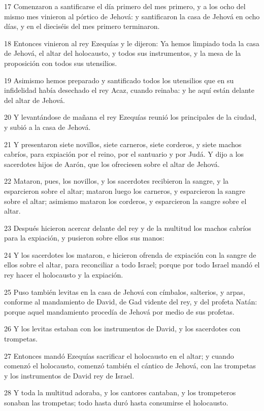 \par 17 Comenzaron a santificarse el día primero del mes primero, y a los ocho del mismo mes vinieron al pórtico de Jehová: y santificaron la casa de Jehová en ocho días, y en el dieciséis del mes primero terminaron.
\par 18 Entonces vinieron al rey Ezequías y le dijeron: Ya hemos limpiado toda la casa de Jehová, el altar del holocausto, y todos sus instrumentos, y la mesa de la proposición con todos sus utensilios.
\par 19 Asimismo hemos preparado y santificado todos los utensilios que en su infidelidad había desechado el rey Acaz, cuando reinaba: y he aquí están delante del altar de Jehová.
\par 20 Y levantándose de mañana el rey Ezequías reunió los principales de la ciudad, y subió a la casa de Jehová.
\par 21 Y presentaron siete novillos, siete carneros, siete corderos, y siete machos cabríos, para expiación por el reino, por el santuario y por Judá. Y dijo a los sacerdotes hijos de Aarón, que los ofreciesen sobre el altar de Jehová.
\par 22 Mataron, pues, los novillos, y los sacerdotes recibieron la sangre, y la esparcieron sobre el altar; mataron luego los carneros, y esparcieron la sangre sobre el altar; asimismo mataron los corderos, y esparcieron la sangre sobre el altar.
\par 23 Después hicieron acercar delante del rey y de la multitud los machos cabríos para la expiación, y pusieron sobre ellos sus manos:
\par 24 Y los sacerdotes los mataron, e hicieron ofrenda de expiación con la sangre de ellos sobre el altar, para reconciliar a todo Israel; porque por todo Israel mandó el rey hacer el holocausto y la expiación.
\par 25 Puso también levitas en la casa de Jehová con címbalos, salterios, y arpas, conforme al mandamiento de David, de Gad vidente del rey, y del profeta Natán: porque aquel mandamiento procedía de Jehová por medio de sus profetas.
\par 26 Y los levitas estaban con los instrumentos de David, y los sacerdotes con trompetas.
\par 27 Entonces mandó Ezequías sacrificar el holocausto en el altar; y cuando comenzó el holocausto, comenzó también el cántico de Jehová, con las trompetas y los instrumentos de David rey de Israel.
\par 28 Y toda la multitud adoraba, y los cantores cantaban, y los trompeteros sonaban las trompetas; todo hasta duró hasta consumirse el holocausto.
